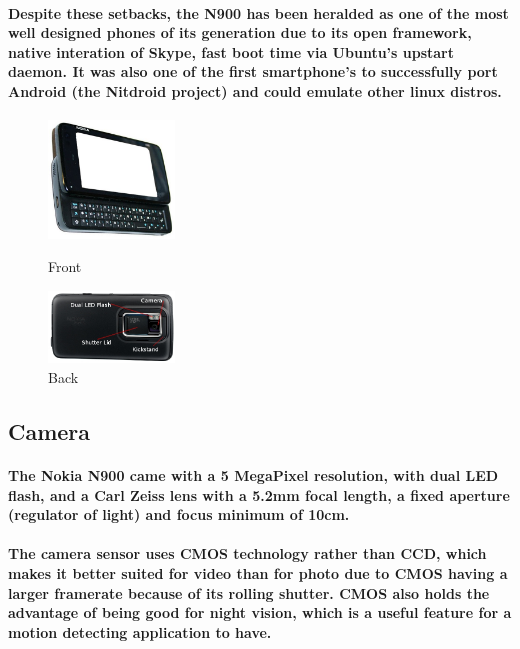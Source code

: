 \documentclass[11pt]{article} %
\begin{document}
\paragraph{Despite these setbacks, the N900 has been heralded as one of the most well designed phones of its generation due to its open framework, native interation of Skype, fast boot time via Ubuntu's upstart daemon. It was also one of the first smartphone's to successfully port Android (the Nitdroid project) and could emulate other linux distros.}

\begin{figure}
	\vspace{-20pt}
	\begin{center}
		\includegraphics[width=0.3\textwidth]{images/wiki_n900}
	\end{center}
	\vspace{-20pt}
	\caption{Front}
	\vspace{10pt}
	\begin{center}
		\includegraphics[width=0.3\textwidth]{images/N900back}
	\end{center}
	\caption{Back}
	\vspace{-20pt}
\end{figure}

\subsection{Camera}
\paragraph{The Nokia N900 came with a 5 MegaPixel resolution, with dual LED flash, and a Carl Zeiss lens with a 5.2mm focal length, a fixed aperture (regulator of light) and focus minimum of 10cm.}

\paragraph{The camera sensor uses CMOS technology rather than CCD, which makes it better suited for video than for photo due to CMOS having a larger framerate because of its rolling shutter. CMOS also holds the advantage of being good for night vision, which is a useful feature for a motion detecting application to have.}
\end{document}
